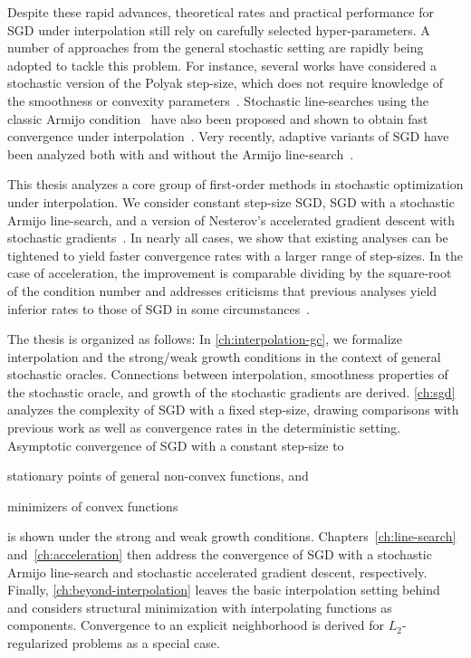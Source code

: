 Despite these rapid advances, theoretical rates and practical performance for \ac{SGD} under interpolation still rely on carefully selected hyper-parameters.
A number of approaches from the general stochastic setting are rapidly being adopted to tackle this problem.
For instance, several works have considered a stochastic version of the Polyak step-size, which does not require knowledge of the smoothness or convexity parameters~\citep{loizou2020sps, berrada2019training}. 
Stochastic line-searches using the classic Armijo condition~\citep{armijo1966ls} have also been proposed and shown to obtain fast convergence under interpolation~\citep{vaswani2019painless}.
Very recently, adaptive variants of \ac{SGD} have been analyzed both with and without the Armijo line-search~\citep{vaswani2020adaptive}.

This thesis analyzes a core group of first-order methods in stochastic optimization under interpolation.
We consider constant step-size \ac{SGD}, \ac{SGD} with a stochastic Armijo line-search, and a version of Nesterov's accelerated gradient descent with stochastic gradients~\citep{nesterov2004lectures}. 
In nearly all cases, we show that existing analyses can be tightened to yield faster convergence rates with a larger range of step-sizes. 
In the case of acceleration, the improvement is comparable dividing by the square-root of the condition number and addresses criticisms that previous analyses yield inferior rates to those of \ac{SGD} in some circumstances~\citep{liu2020accelerating}. 

The thesis is organized as follows: 
In \autoref{ch:interpolation-gc}, we formalize interpolation and the strong/weak growth conditions in the context of general stochastic oracles. 
Connections between interpolation, smoothness properties of the stochastic oracle, and growth of the stochastic gradients are derived.
\autoref{ch:sgd} analyzes the complexity of \ac{SGD} with a fixed step-size, drawing comparisons with previous work as well as convergence rates in the deterministic setting. 
Asymptotic convergence of SGD with a constant step-size to
\begin{inparaenum}[(i)]
\item stationary points of general non-convex functions, and
\item minimizers of convex functions 
\end{inparaenum}
is shown under the strong and weak growth conditions.
Chapters~\ref{ch:line-search} and~\ref{ch:acceleration} then address the convergence of \ac{SGD} with a stochastic Armijo line-search and stochastic accelerated gradient descent, respectively. 
Finally, \autoref{ch:beyond-interpolation} leaves the basic interpolation setting behind and considers structural minimization with interpolating functions as components. 
Convergence to an explicit neighborhood is derived for \( L_2 \)-regularized problems as a special case. \\


